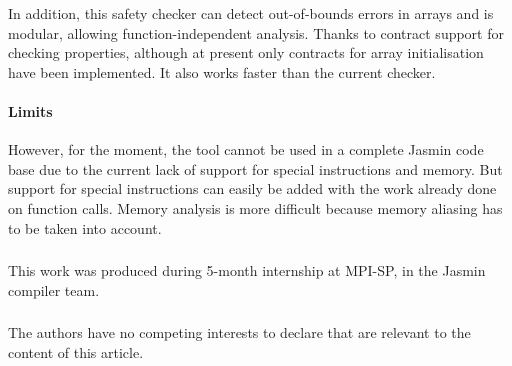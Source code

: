 \documentclass[runningheads]{llncs}
\begin{document}
In addition, this safety checker can detect out-of-bounds errors 
in arrays and is modular, allowing function-independent analysis. 
Thanks to contract support for checking properties, although at present 
only contracts for array initialisation have been implemented. It also works 
faster than the current checker.


\paragraph{Limits}
However, for the moment, the tool cannot be used in a complete Jasmin code 
base due to the current lack of support for special instructions and memory.
But support for special instructions can easily be added with the work already 
done on function calls. Memory analysis is more difficult because memory aliasing 
has to be taken into account.


\begin{credits}
\subsubsection{\ackname}
This work was produced during 5-month internship at MPI-SP,
in the Jasmin compiler team.


\subsubsection{\discintname}
The authors have no competing interests to declare that are
relevant to the content of this article.

\end{credits}
%
%
%


%




\end{document}
